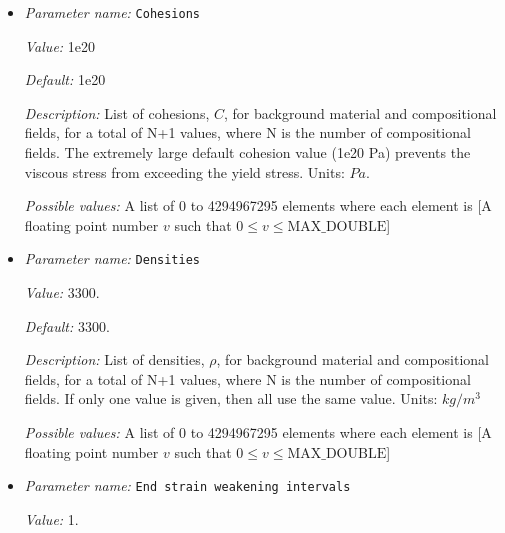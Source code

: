 \begin{itemize}
{\it Description:} List of cohesion strain weakening factors for background material and compositional fields, for a total of N+1 values, where N is the number of compositional fields. If only one value is given, then all use the same value.  Units: None


{\it Possible values:} A list of 0 to 4294967295 elements where each element is [A floating point number $v$ such that $0 \leq v \leq \text{MAX\_DOUBLE}$]
\item {\it Parameter name:} {\tt Cohesions}
\label{parameters:Material model/Visco Plastic/Cohesions}


{\it Value:} 1e20


{\it Default:} 1e20


{\it Description:} List of cohesions, $C$, for background material and compositional fields, for a total of N+1 values, where N is the number of compositional fields. The extremely large default cohesion value (1e20 Pa) prevents the viscous stress from exceeding the yield stress. Units: $Pa$.


{\it Possible values:} A list of 0 to 4294967295 elements where each element is [A floating point number $v$ such that $0 \leq v \leq \text{MAX\_DOUBLE}$]
\item {\it Parameter name:} {\tt Densities}
\label{parameters:Material model/Visco Plastic/Densities}


{\it Value:} 3300.


{\it Default:} 3300.


{\it Description:} List of densities, $\rho$, for background material and compositional fields, for a total of N+1 values, where N is the number of compositional fields. If only one value is given, then all use the same value.  Units: $kg / m^3$


{\it Possible values:} A list of 0 to 4294967295 elements where each element is [A floating point number $v$ such that $0 \leq v \leq \text{MAX\_DOUBLE}$]
\item {\it Parameter name:} {\tt End strain weakening intervals}
\label{parameters:Material model/Visco Plastic/End strain weakening intervals}


{\it Value:} 1.



\end{itemize}
